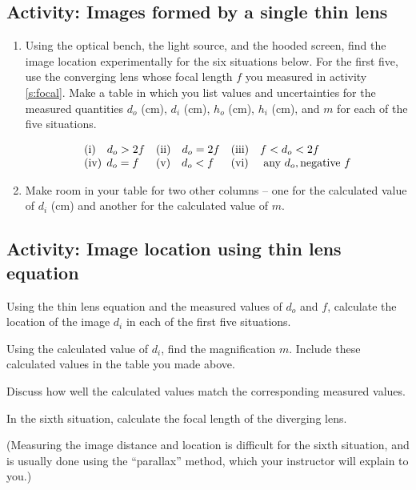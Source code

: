 \subsection{Activity: Images formed by a single thin lens}\label{s:thinlens}
\begin{enumerate}
	\item Using the optical bench, the light source, and the hooded screen, find the image location experimentally for the six situations below. For the first five, use the converging lens whose focal length $f$ you measured in activity \ref{s:focal}. Make a table in which you list values and uncertainties for the measured quantities $d_o$ (cm), $d_i$ (cm), $h_o$ (cm), $h_i$ (cm), and  $m$ for each of the five situations.
	
\begin{equation*}
\begin{array}{lll}
	\text{(i)} \quad d_o > 2f	& \text{(ii)} \quad d_o = 2f 
	& \text{(iii)} \quad f < d_o < 2f \\
	\text{(iv)}\;\, d_o = f	& \text{(v)} \quad d_o < f  %
	& \text{(vi) \quad any}\  d_o, \text{negative}\  f
\end{array}
\end{equation*}
		
	\item Make room in your table for two other columns -- one for the calculated value of $d_i$ (cm) and another for the calculated value of $m$.
\end{enumerate}

\subsection{Activity: Image location using thin lens equation}
\begin{enumerate}
	\item Using the thin lens equation and the measured values of $d_o$ and $f$, calculate the location of the image $d_i$ in each of the first five situations. 
	\item Using the calculated value of $d_i$, find the magnification $m$. Include these calculated values in the table you made above. 
	\item Discuss how well the calculated values match the corresponding measured values. 
	\item In the sixth situation, calculate the focal length of the diverging lens.
	{\item (Measuring the image distance and location is difficult for the sixth situation, and is usually done using the ``parallax'' method, which your instructor will explain to you.)}
\end{enumerate}

